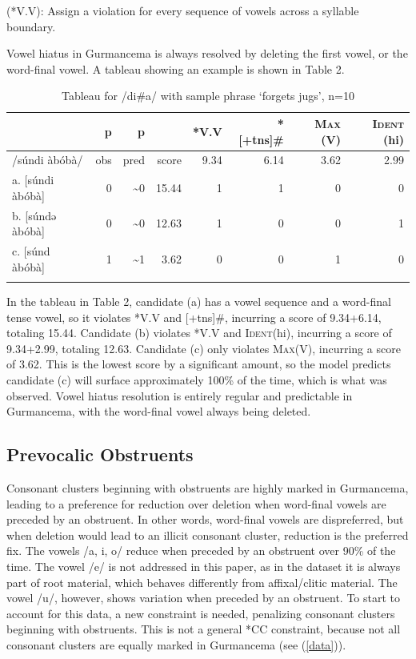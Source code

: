 \documentclass[output=paper,newtxmath,modfonts,nonflat,draftmode]{langsci/langscibook}
\begin{document}
\ea
 (*V.V): Assign a violation for every sequence of vowels across a syllable 	boundary. 
\z
  
  Vowel hiatus in Gurmancema is always resolved by deleting the first vowel, or 
  the word-final vowel. A tableau showing an example is shown in Table 2.
  
\begin{table}
\caption{Tableau for /di\#a/ with sample phrase ‘forgets jugs’, n=10}
\label{tab:baird:2}
\small
{\begin{tabularx}{\textwidth}{Xrrrrrrr} 
\lsptoprule
{} &   p   &   p   &    &   *V.V   &   *[+tns]\#   &   \textsc{Max} (V)   &   \textsc{Ident} (hi)  \\
\midrule
/súndi àbóbà/ & obs & pred & score & 9.34 & 6.14 & 3.62 & 2.99 \\
{a. [súndi àbóbà]} & 0 & \textasciitilde 0 & 15.44 & 1 & 1 & 0 & 0 \\
{b. [súndə àbóbà]} & 0 & \textasciitilde 0 & 12.63 & 1 & 0 & 0 & 1 \\
{c. [súnd àbóbà]} & 1 & \textasciitilde 1 & 3.62 & 0 & 0 & 1 & 0 \\
 \lspbottomrule\end{tabularx}} 
\end{table}

In the tableau in Table 2, candidate (a) has a vowel sequence and a word-final tense vowel, so it violates *V.V and [+tns]\#, incurring a score of 9.34+6.14, totaling 15.44. Candidate (b) violates *V.V and \textsc{Ident}(hi), incurring a score of 9.34+2.99, totaling 12.63. Candidate (c) only violates \textsc{Max}(V), incurring a score of 3.62. This is the lowest score by a significant amount, so the model predicts candidate (c) will surface approximately 100\% of the time, which is what was observed. 
Vowel hiatus resolution is entirely regular and predictable in Gurmancema, with 
the word-final vowel always being deleted.

\subsection{Prevocalic Obstruents}
Consonant clusters beginning with obstruents are highly marked in Gurmancema, 
leading to a preference for reduction over deletion when word-final vowels are preceded by an obstruent. In other words, word-final vowels are dispreferred, but when deletion would lead to an illicit consonant cluster, reduction is the preferred fix. The vowels /a, i, o/ reduce when preceded by an obstruent over 90\% of the time. The vowel /e/ is not addressed in this paper, as in the dataset it is always part of root material, which behaves differently from affixal/clitic material. The vowel /u/, however, shows variation when preceded by an obstruent. To start to account for this data, a new constraint is needed, penalizing consonant clusters beginning with obstruents. This is not a general *CC constraint, because not all consonant clusters are equally marked in Gurmancema (see (\ref{data})). 
\end{document}

